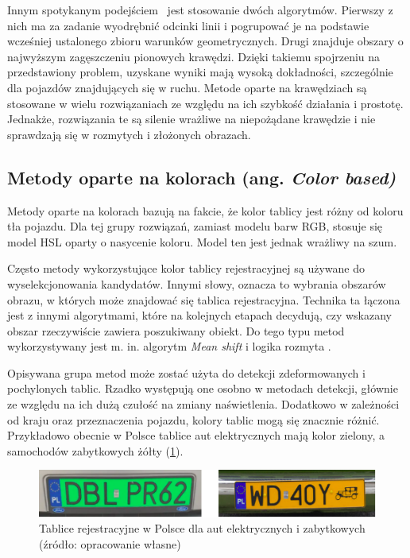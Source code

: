 Innym spotykanym podejściem~\cite{4410602} jest stosowanie dwóch algorytmów.
Pierwszy z nich ma za zadanie wyodrębnić odcinki linii i pogrupować je na podstawie wcześniej ustalonego zbioru warunków geometrycznych.
Drugi znajduje obszary o najwyższym zagęszczeniu pionowych krawędzi.
Dzięki takiemu spojrzeniu na przedstawiony problem, uzyskane wyniki mają wysoką dokładności, szczególnie dla pojazdów znajdujących się w ruchu.
Metode oparte na krawędziach są stosowane w wielu rozwiązaniach ze względu na ich szybkość działania i prostotę.
Jednakże, rozwiązania te są silenie wrażliwe na niepożądane krawędzie i nie sprawdzają się w rozmytych i złożonych obrazach.

\subsection{Metody oparte na kolorach (ang. \textit{Color based)}}
Metody oparte na kolorach bazują na fakcie, że kolor tablicy jest różny od koloru tła pojazdu.
Dla tej grupy rozwiązań, zamiast modelu barw RGB, stosuje się model HSL oparty o nasycenie koloru.
Model ten jest jednak wrażliwy na szum.

Często metody wykorzystujące kolor tablicy rejestracyjnej są używane do wyselekcjonowania kandydatów.
Innymi słowy, oznacza to wybrania obszarów obrazu, w których może znajdować się tablica rejestracyjna.
Technika ta łączona jest z innymi algorytmami, które na kolejnych etapach decydują, czy wskazany obszar rzeczywiście zawiera poszukiwany obiekt.
Do tego typu metod wykorzystywany jest m. in. algorytm \textit{Mean shift} \cite{1520110} i logika rozmyta \cite{Wang2008FuzzybasedAF}.

Opisywana grupa metod może zostać użyta do detekcji zdeformowanych i pochylonych tablic.
Rzadko występują one osobno w metodach detekcji, głównie ze względu na ich dużą czułość na zmiany naświetlenia.
Dodatkowo w zależności od kraju oraz przeznaczenia pojazdu, kolory tablic mogą się znacznie różnić.
Przykładowo obecnie w Polsce tablice aut elektrycznych mają kolor zielony, a samochodów zabytkowych żółty (\ref{fig:tablice}).
\FloatBarrier
\begin{figure}[!ht]
    \centering
    \includegraphics[scale=0.6]{Pictures/tablice}
    \caption{Tablice rejestracyjne w Polsce dla aut elektrycznych i zabytkowych (źródło: opracowanie własne)}
    \label{fig:tablice}
\end{figure}
\FloatBarrier

